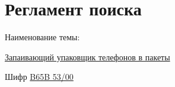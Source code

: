 \documentclass{bsuir}
\begin{document}
\maketitle
\mainmatter

\chapter*{Регламент поиска}

Наименование темы:

\uline{Запаивающий упаковщик телефонов в пакеты\hfill}

Шифр \underline{B65B 53/00}

\end{document}
